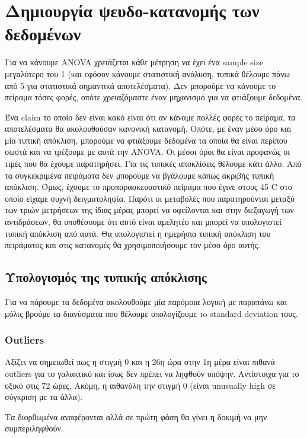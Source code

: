 \documentclass[11pt]{article}
\begin{document}
\section{Δημιουργία ψευδο-κατανομής των δεδομένων}
\label{sec:org1ca7c95}
Για να κάνουμε ANOVA χρειάζεται κάθε μέτρηση να έχει ένα sample size μεγαλύτερο του 1 (και εφόσον κάνουμε στατιστική ανάλυση, τυπικά θέλουμε πάνω από 5 για στατιστικά σημαντικά αποτελέσματα). Δεν μπορούμε να κάνουμε το πείραμα τόσες φορές, οπότε χρειαζόμαστε έναν μηχανισμό για να φτιάξουμε δεδομένα.

Ένα claim το οποίο δεν είναι κακό είναι ότι αν κάναμε πολλές φορές το πείραμα, τα αποτελέσματα θα ακολουθούσαν κανονική κατανομή. Οπότε, με έναν μέσο όρο και μία τυπική απόκλιση, μπορούμε να φτιάξουμε δεδομένα τα οποία θα είναι περίπου σωστά και να τρέξουμε με αυτά την ANOVA. Οι μέσοι όροι θα είναι προφανώς οι τιμές που θα έχουμε παρατηρήσει. Για τις τυπικές αποκλίσεις θέλουμε κάτι άλλο. Από τα συγκεκριμένα πειράματα δεν μπορούμε να βγάλουμε κάπως ακριβής τυπική απόκλιση. Όμως, έχουμε το προπαρασκευαστικό πείραμα που έγινε στους 45 C στο οποίο είχαμε συχνή δειγματοληψία. Παρότι οι μεταβολές που παρατηρούνται μεταξύ των τριών μετρήσεων της ίδιας μέρας μπορεί να οφείλονται και στην διεξαγωγή των αντιδράσεων, θα υποθέσουμε ότι αυτό είναι αμελητέο και μπορεί να υπολογιστεί τυπική απόκλιση από αυτά. Θα υπολογιστεί η ημερήσια τυπική απόκλιση του πειράματος και στις κατανομές θα χρησιμοποιήσουμε τον μέσο όρο αυτής.

\subsection{Υπολογισμός της τυπικής απόκλισης}
\label{sec:org7bd22bf}
Για να πάρουμε τα δεδομένα ακολουθούμε μία παρόμοια λογική με παραπάνω και μόλις βρούμε τα διανύσματα που θέλουμε υπολογίζουμε τo standard deviation τους.

\subsubsection{Outliers}
\label{sec:orgeaacb12}
Αξίζει να σημειωθεί πως η στιγμή 0 και η 26η ώρα στην 1η μέρα είναι πιθανά outliers για το γαλακτικό και ίσως δεν πρέπει να ληφθούν υπόψην. Αντίστοιχα για το οξικό στις 72 ώρες. Ακόμη, η αιθανόλη την στιγμή 0 (είναι unusually high σε σύγκριση με τα άλλα). 

Τα διορθωμένα αναφέρονται αλλά σε πρώτη φάση θα γίνει η δοκιμή να μην συμπεριληφθούν. 
\end{document}
